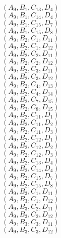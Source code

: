 \documentclass[14pt]{article}
\begin{document}
    $({A}_{9}, {B}_{1}, {C}_{13}, {D}_{4}) $ \\ 
    $({A}_{9}, {B}_{1}, {C}_{14}, {D}_{4}) $ \\ 
    $({A}_{9}, {B}_{1}, {C}_{15}, {D}_{7}) $ \\ 
    $({A}_{9}, {B}_{1}, {C}_{15}, {D}_{8}) $ \\ 
    $({A}_{9}, {B}_{2}, {C}_{1}, {D}_{11}) $ \\ 
    $({A}_{9}, {B}_{2}, {C}_{1}, {D}_{12}) $ \\ 
    $({A}_{9}, {B}_{2}, {C}_{2}, {D}_{11}) $ \\ 
    $({A}_{9}, {B}_{2}, {C}_{2}, {D}_{12}) $ \\ 
    $({A}_{9}, {B}_{2}, {C}_{3}, {D}_{11}) $ \\ 
    $({A}_{9}, {B}_{2}, {C}_{3}, {D}_{12}) $ \\ 
    $({A}_{9}, {B}_{2}, {C}_{4}, {D}_{13}) $ \\ 
    $({A}_{9}, {B}_{2}, {C}_{4}, {D}_{14}) $ \\ 
    $({A}_{9}, {B}_{2}, {C}_{7}, {D}_{15}) $ \\ 
    $({A}_{9}, {B}_{2}, {C}_{8}, {D}_{15}) $ \\ 
    $({A}_{9}, {B}_{2}, {C}_{11}, {D}_{1}) $ \\ 
    $({A}_{9}, {B}_{2}, {C}_{11}, {D}_{2}) $ \\ 
    $({A}_{9}, {B}_{2}, {C}_{11}, {D}_{3}) $ \\ 
    $({A}_{9}, {B}_{2}, {C}_{12}, {D}_{1}) $ \\ 
    $({A}_{9}, {B}_{2}, {C}_{12}, {D}_{2}) $ \\ 
    $({A}_{9}, {B}_{2}, {C}_{12}, {D}_{3}) $ \\ 
    $({A}_{9}, {B}_{2}, {C}_{13}, {D}_{4}) $ \\ 
    $({A}_{9}, {B}_{2}, {C}_{14}, {D}_{4}) $ \\ 
    $({A}_{9}, {B}_{2}, {C}_{15}, {D}_{7}) $ \\ 
    $({A}_{9}, {B}_{2}, {C}_{15}, {D}_{8}) $ \\ 
    $({A}_{9}, {B}_{3}, {C}_{1}, {D}_{11}) $ \\ 
    $({A}_{9}, {B}_{3}, {C}_{1}, {D}_{12}) $ \\ 
    $({A}_{9}, {B}_{3}, {C}_{2}, {D}_{11}) $ \\ 
    $({A}_{9}, {B}_{3}, {C}_{2}, {D}_{12}) $ \\ 
    $({A}_{9}, {B}_{3}, {C}_{3}, {D}_{11}) $ \\ 
    $({A}_{9}, {B}_{3}, {C}_{3}, {D}_{12}) $ \\ 
\end{document}

